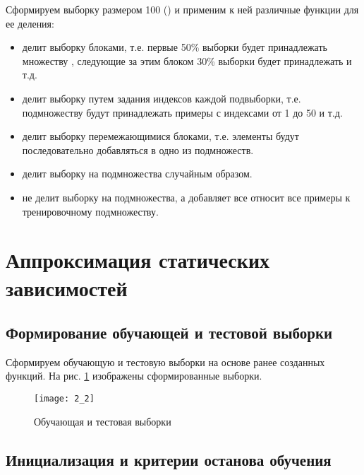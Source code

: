 Сформируем выборку размером 100 () и применим к ней различные функции для ее деления:
\begin{itemize}
	\item {} делит выборку блоками, т.е. первые 50\% выборки будет принадлежать множеству , следующие за этим блоком 30\% выборки будет принадлежать  и т.д.
	\item {} делит выборку путем задания индексов каждой подвыборки, т.е. подмножеству  будут принадлежать примеры с индексами от 1 до 50 и т.д.
	\item {} делит выборку перемежающимися блоками, т.е. элементы будут последовательно добавляться в одно из подмножеств.
	\item {} делит выборку на подмножества случайным образом.
	\item {} не делит выборку на подмножества, а добавляет все относит все примеры к тренировочному подмножеству.
\end{itemize}

\section{Аппроксимация статических зависимостей}

\subsection{Формирование обучающей и тестовой выборки}

Сформируем обучающую и тестовую выборки на основе ранее созданных функций. На рис. \ref{fig:2_2} изображены сформированные выборки.
\vspace{-0.5cm}
\begin{figure}[H]
\begin{center}
	\texttt{[image: 2\_2]}
	\caption{Обучающая и тестовая выборки}
	\label{fig:2_2}
\end{center}
\end{figure}
\vspace{-1.5cm}

\subsection{Инициализация и критерии останова обучения}

